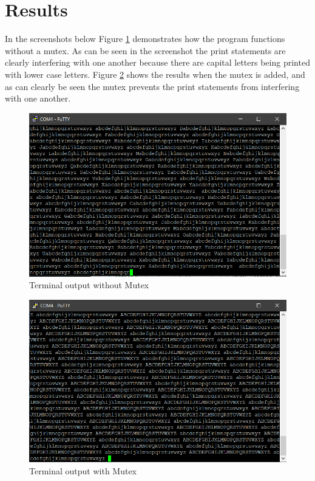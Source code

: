 \documentclass[10pt,a4paper]{article}
\begin{document}
	\section{Results}
	In the screenshots below Figure \ref{notex} demonstrates how the program functions without a mutex. As can be seen in the screenshot the print statements are clearly interfering with one another because there are capital letters being printed with lower case letters. Figure \ref{tex} shows the results when the mutex is added, and as can clearly be seen the mutex prevents the print statements from interfering with one another.
	\begin{figure}[H]
	\centering\includegraphics[width=15cm]{Output_No_Mutex.png}
	\caption{Terminal output without Mutex}
	\label{notex}
	\end{figure}
	\begin{figure}[H]
		\centering\includegraphics[width=15cm]{Output_With_Mutex.png}
		\caption{Terminal output with Mutex}
		\label{tex}
	\end{figure}
\end{document}
